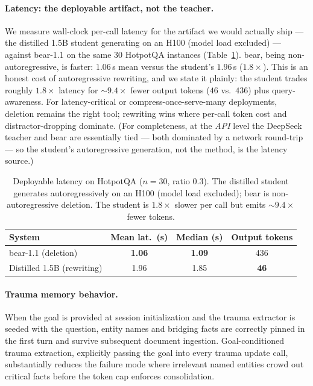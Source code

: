 \documentclass{article}
\begin{document}
\paragraph{Latency: the deployable artifact, not the teacher.}
We measure wall-clock per-call latency for the artifact we would actually
ship --- the distilled 1.5B student generating on an H100 (model load
excluded) --- against bear-1.1 on the same 30 HotpotQA instances
(Table~\ref{tab:latency}). bear, being non-autoregressive, is faster:
$1.06$\,s mean versus the student's $1.96$\,s ($1.8\times$). This is an
honest cost of autoregressive rewriting, and we state it plainly: the student
trades roughly $1.8\times$ latency for $\sim$$9.4\times$ fewer output tokens
($46$ vs.\ $436$) plus query-awareness. For latency-critical or
compress-once-serve-many deployments, deletion remains the right tool;
rewriting wins where per-call token cost and distractor-dropping dominate.
(For completeness, at the \emph{API} level the DeepSeek teacher and bear are
essentially tied --- both dominated by a network round-trip --- so the
student's autoregressive generation, not the method, is the latency source.)

\begin{table}[t]
\caption{Deployable latency on HotpotQA ($n=30$, ratio 0.3). The distilled
student generates autoregressively on an H100 (model load excluded); bear is
non-autoregressive deletion. The student is $1.8\times$ slower per call but
emits $\sim$$9.4\times$ fewer tokens.}
\label{tab:latency}
\centering
\begin{tabular}{lccc}
\toprule
System & Mean lat.\ (s) & Median (s) & Output tokens \\
\midrule
bear-1.1 (deletion)            & \textbf{1.06} & \textbf{1.09} & 436 \\
Distilled 1.5B (rewriting)     & 1.96          & 1.85          & \textbf{46} \\
\bottomrule
\end{tabular}
\end{table}

\paragraph{Trauma memory behavior.}
When the goal is provided at session initialization and the trauma
extractor is seeded with the question, entity names and bridging facts
are correctly pinned in the first turn and survive subsequent document
ingestion. Goal-conditioned trauma extraction, explicitly passing the
goal into every trauma update call, substantially reduces the failure
mode where irrelevant named entities crowd out critical facts before
the token cap enforces consolidation.
\end{document}
